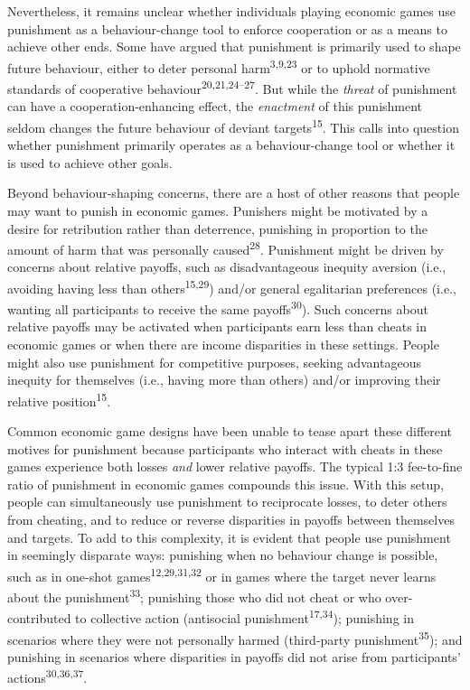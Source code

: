 \documentclass[
  man,floatsintext]{apa6}
\begin{document}
Nevertheless, it remains unclear whether individuals playing economic games use punishment as a behaviour-change tool to enforce cooperation or as a means to achieve other ends. Some have argued that punishment is primarily used to shape future behaviour, either to deter personal harm\textsuperscript{3,9,23} or to uphold normative standards of cooperative behaviour\textsuperscript{20,21,24--27}. But while the \emph{threat} of punishment can have a cooperation-enhancing effect, the \emph{enactment} of this punishment seldom changes the future behaviour of deviant targets\textsuperscript{15}. This calls into question whether punishment primarily operates as a behaviour-change tool or whether it is used to achieve other goals.

Beyond behaviour-shaping concerns, there are a host of other reasons that people may want to punish in economic games. Punishers might be motivated by a desire for retribution rather than deterrence, punishing in proportion to the amount of harm that was personally caused\textsuperscript{28}. Punishment might be driven by concerns about relative payoffs, such as disadvantageous inequity aversion (i.e., avoiding having less than others\textsuperscript{15,29}) and/or general egalitarian preferences (i.e., wanting all participants to receive the same payoffs\textsuperscript{30}). Such concerns about relative payoffs may be activated when participants earn less than cheats in economic games or when there are income disparities in these settings. People might also use punishment for competitive purposes, seeking advantageous inequity for themselves (i.e., having more than others) and/or improving their relative position\textsuperscript{15}.

Common economic game designs have been unable to tease apart these different motives for punishment because participants who interact with cheats in these games experience both losses \emph{and} lower relative payoffs. The typical 1:3 fee-to-fine ratio of punishment in economic games compounds this issue. With this setup, people can simultaneously use punishment to reciprocate losses, to deter others from cheating, and to reduce or reverse disparities in payoffs between themselves and targets. To add to this complexity, it is evident that people use punishment in seemingly disparate ways: punishing when no behaviour change is possible, such as in one-shot games\textsuperscript{12,29,31,32} or in games where the target never learns about the punishment\textsuperscript{33}; punishing those who did not cheat or who over-contributed to collective action (antisocial punishment\textsuperscript{17,34}); punishing in scenarios where they were not personally harmed (third-party punishment\textsuperscript{35}); and punishing in scenarios where disparities in payoffs did not arise from participants' actions\textsuperscript{30,36,37}.
\end{document}
